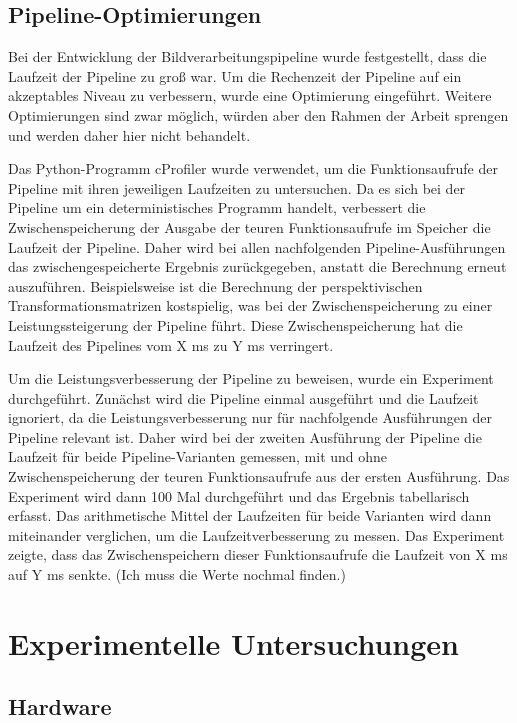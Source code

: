 \documentclass[arbeit=studie,oneside,BCOR=12mm]{ArbeitRST}
\begin{document}
\section{Pipeline-Optimierungen}

Bei der Entwicklung der Bildverarbeitungspipeline wurde festgestellt, dass die
Laufzeit der Pipeline zu gro{\ss} war. Um die Rechenzeit der Pipeline auf ein
akzeptables Niveau zu verbessern, wurde eine Optimierung eingeführt. Weitere
Optimierungen sind zwar möglich, würden aber den Rahmen der Arbeit sprengen und
werden daher hier nicht behandelt.

Das Python-Programm cProfiler wurde verwendet, um die Funktionsaufrufe der
Pipeline mit ihren jeweiligen Laufzeiten zu untersuchen. Da es sich bei der
Pipeline um ein deterministisches Programm handelt, verbessert die
Zwischenspeicherung der Ausgabe der teuren Funktionsaufrufe im Speicher die
Laufzeit der Pipeline. Daher wird bei allen nachfolgenden Pipeline-Ausführungen
das zwischengespeicherte Ergebnis zurückgegeben, anstatt die Berechnung erneut
auszuführen. Beispielsweise ist die Berechnung der perspektivischen
Transformationsmatrizen kostspielig, was bei der Zwischenspeicherung zu einer
Leistungssteigerung der Pipeline führt. Diese Zwischenspeicherung hat die Laufzeit 
des Pipelines vom X ms zu Y ms verringert.

Um die Leistungsverbesserung der Pipeline zu beweisen, wurde ein Experiment
durchgeführt. Zunächst wird die Pipeline einmal ausgeführt und die Laufzeit
ignoriert, da die Leistungsverbesserung nur für nachfolgende Ausführungen der
Pipeline relevant ist. Daher wird bei der zweiten Ausführung der Pipeline die
Laufzeit für beide Pipeline-Varianten gemessen, mit und ohne
Zwischenspeicherung der teuren Funktionsaufrufe aus der ersten Ausführung. Das
Experiment wird dann 100 Mal durchgeführt und das Ergebnis tabellarisch
erfasst. Das arithmetische Mittel der Laufzeiten für beide Varianten wird dann
miteinander verglichen, um die Laufzeitverbesserung zu messen. Das Experiment
zeigte, dass das Zwischenspeichern dieser Funktionsaufrufe die Laufzeit von X
ms auf Y ms senkte. (Ich muss die Werte nochmal finden.)


\chapter{Experimentelle Untersuchungen}
\section{Hardware}
\end{document}
